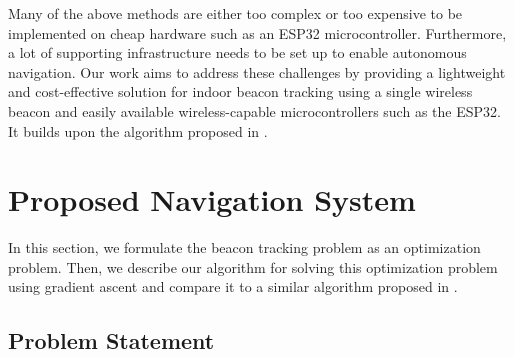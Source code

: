 \documentclass[conference]{IEEEtran}
\begin{document}
Many of the above methods are either too complex or too expensive to be
implemented on cheap hardware such as an ESP32 microcontroller. Furthermore, a
lot of supporting infrastructure needs to be set up to enable autonomous
navigation. Our work aims to address these challenges by providing a lightweight
and cost-effective solution for indoor beacon tracking using a single wireless
beacon and easily available wireless-capable microcontrollers such as the ESP32.
It builds upon the algorithm proposed in
\cite{dubeyNavigationCommunicationUGV2022}.

\section{Proposed Navigation System}
\label{sec:proposed-system}

In this section, we formulate the beacon tracking problem as an optimization
problem. Then, we describe our algorithm for solving this optimization problem
using gradient ascent and compare it to a similar algorithm proposed in
\cite{dubeyNavigationCommunicationUGV2022}.

\subsection{Problem Statement}
\label{subsec:problem-statement}
\end{document}
